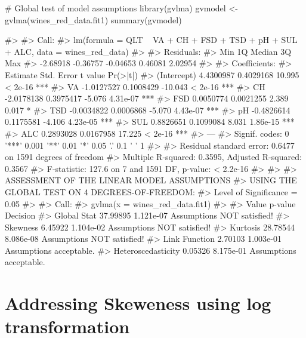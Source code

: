 \begin{Schunk}
\begin{Sinput}
# Global test of model assumptions
library(gvlma)
gvmodel <- gvlma(wines_red_data.fit1) 
summary(gvmodel)
\end{Sinput}
\begin{Soutput}
#> 
#> Call:
#> lm(formula = QLT ~ VA + CH + FSD + TSD + pH + SUL + ALC, data = wines_red_data)
#> 
#> Residuals:
#>      Min       1Q   Median       3Q      Max 
#> -2.68918 -0.36757 -0.04653  0.46081  2.02954 
#> 
#> Coefficients:
#>               Estimate Std. Error t value Pr(>|t|)    
#> (Intercept)  4.4300987  0.4029168  10.995  < 2e-16 ***
#> VA          -1.0127527  0.1008429 -10.043  < 2e-16 ***
#> CH          -2.0178138  0.3975417  -5.076 4.31e-07 ***
#> FSD          0.0050774  0.0021255   2.389    0.017 *  
#> TSD         -0.0034822  0.0006868  -5.070 4.43e-07 ***
#> pH          -0.4826614  0.1175581  -4.106 4.23e-05 ***
#> SUL          0.8826651  0.1099084   8.031 1.86e-15 ***
#> ALC          0.2893028  0.0167958  17.225  < 2e-16 ***
#> ---
#> Signif. codes:  0 '***' 0.001 '**' 0.01 '*' 0.05 '.' 0.1 ' ' 1
#> 
#> Residual standard error: 0.6477 on 1591 degrees of freedom
#> Multiple R-squared:  0.3595, Adjusted R-squared:  0.3567 
#> F-statistic: 127.6 on 7 and 1591 DF,  p-value: < 2.2e-16
#> 
#> 
#> ASSESSMENT OF THE LINEAR MODEL ASSUMPTIONS
#> USING THE GLOBAL TEST ON 4 DEGREES-OF-FREEDOM:
#> Level of Significance =  0.05 
#> 
#> Call:
#>  gvlma(x = wines_red_data.fit1) 
#> 
#>                       Value   p-value                   Decision
#> Global Stat        37.99895 1.121e-07 Assumptions NOT satisfied!
#> Skewness            6.45922 1.104e-02 Assumptions NOT satisfied!
#> Kurtosis           28.78544 8.086e-08 Assumptions NOT satisfied!
#> Link Function       2.70103 1.003e-01    Assumptions acceptable.
#> Heteroscedasticity  0.05326 8.175e-01    Assumptions acceptable.
\end{Soutput}
\end{Schunk}

\hypertarget{addressing-skeweness-using-log-transformation}{%
\section{Addressing Skeweness using log
transformation}\label{addressing-skeweness-using-log-transformation}}


